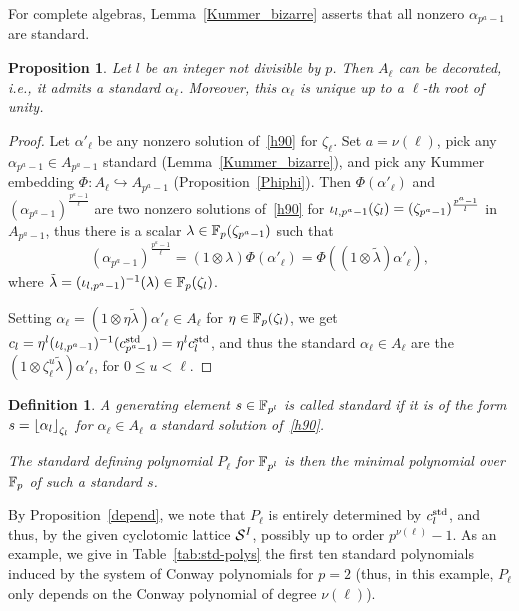 \documentclass[sigconf]{acmart}
\newtheorem{proposition}[theorem]{Proposition}
\newtheorem{definition}[theorem]{Definition}
\begin{document}
For complete algebras, Lemma~\ref{Kummer_bizarre} asserts that all nonzero $\alpha_{p^a-1}$ are standard.
\begin{proposition}
\label{standardexiste}
Let $l$ be an integer not divisible by $p$.
Then $A_\ell$ can be decorated, i.e., it admits a standard $\alpha_\ell$.
Moreover, this $\alpha_\ell$ is unique up to a $\ell$-th root of unity.
\end{proposition}
\begin{proof}
Let $\alpha'_\ell$ be any nonzero solution of~\eqref{h90} for $\zeta_\ell$.
Set $a=\nu(\ell)$, pick any $\alpha_{p^a-1}\in A_{p^a-1}$ standard (Lemma~\ref{Kummer_bizarre}),
and pick any Kummer embedding $\Phi:A_\ell\hookrightarrow A_{p^a-1}$ (Proposition~\ref{Phiphi}).
Then $\Phi(\alpha'_\ell)$ and $(\alpha_{p^a-1})^{\frac{p^a-1}{\ell}}$ are two nonzero solutions of~\eqref{h90}
for ${\iota_{{l},{p^a-1}}}(\zeta_l)=(\zeta_{p^a-1})^{\frac{p^a-1}{l}}$ in $A_{p^a-1}$, thus there is a scalar $\lambda\in\mathbb{F}_{p}(\zeta_{p^a-1})$
such that
\begin{equation*}
(\alpha_{p^a-1})^{\frac{p^a-1}{\ell}}=(1\otimes\lambda)\Phi(\alpha'_\ell)=\Phi((1\otimes\tilde\lambda)\alpha'_\ell),
\end{equation*}
where $\tilde\lambda=({\iota_{{l},{p^a-1}}})^{-1}(\lambda)\in\mathbb{F}_{p}(\zeta_{l})$.

Setting $\alpha_\ell=(1\otimes\eta\tilde\lambda)\alpha'_\ell\in A_\ell$ for $\eta\in\mathbb{F}_{p}(\zeta_l)$,
we get $c_{l}=\eta^l({\iota_{{l},{p^a-1}}})^{-1}(c^{\mathrm{std}}_{p^a-1})=\eta^lc^{\mathrm{std}}_l$, and
thus the standard $\alpha_\ell\in A_\ell$ are the $(1\otimes\zeta_\ell^u\tilde\lambda)\alpha'_\ell$, for $0\leq u<\ell$.
\end{proof}

\begin{definition}
\label{sstandard}
A generating element $s\in\mathbb{F}_{p^l}$ is called \emph{standard}
if it is of the form $s=\left\lfloor \alpha_{l} \right\rfloor_{\zeta_l}$ for $\alpha_{\ell}\in A_\ell$
a standard solution of~\eqref{h90}.

The \emph{standard defining polynomial} $P_\ell$ for $\mathbb{F}_{p^l}$ is then the minimal polynomial over $\mathbb{F}_p$
of such a standard $s$.
\end{definition}

By Proposition~\ref{depend}, we note that $P_\ell$ is entirely determined by $c^{\mathrm{std}}_{l}$,
and thus, by the given cyclotomic lattice $\mathcal{S}^{I}$, possibly up to order $p^{\nu(\ell)}-1$.
As an example, we give in Table~\ref{tab:std-polys} the first ten
standard polynomials induced by the system of Conway polynomials
for $p=2$ (thus, in this example, $P_\ell$ only depends on the Conway polynomial of degree $\nu(\ell)$).
\end{document}

